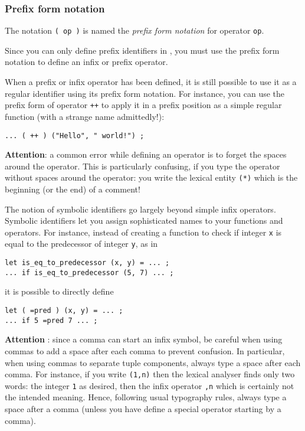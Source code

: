 \subsubsection{Prefix form notation}

The notation {\tt ( op )} is named the {\em prefix form notation} for
operator {\tt op}.

Since you can only define prefix identifiers in {\focal}, you must use the
prefix form notation to define an infix or prefix operator.

When a prefix or infix operator has been defined, it is still possible
to use it as a regular identifier using its prefix form notation.
For instance, you can use the prefix form of operator {\tt ++}
to apply it in a prefix position as a simple regular function (with a
strange name admittedly!):

{\scriptsize
\begin{lstlisting}
... ( ++ ) ("Hello", " world!") ;
\end{lstlisting}
}

{\bf Attention}: a common error while defining an operator is to forget
the spaces around the operator. This is particularly confusing, if you
type the {\tt *} operator without spaces around the operator: you
write the lexical entity {\tt (*)} which is the beginning (or the end)
of a comment!

The {\focal} notion of symbolic identifiers go largely beyond simple
infix operators. Symbolic identifiers let you assign sophisticated names
to your functions and operators.
For instance, instead of creating a function to check if integer {\tt x}
is equal to the predecessor of integer {\tt y}, as in
{\scriptsize
\begin{lstlisting}
let is_eq_to_predecessor (x, y) = ... ;
... if is_eq_to_predecessor (5, 7) ... ;
\end{lstlisting}
}
it is possible to directly define
{\scriptsize
\begin{lstlisting}
let ( =pred ) (x, y) = ... ;
... if 5 =pred 7 ... ;
\end{lstlisting}
}

{\bf Attention} : since a comma can start an infix symbol, be careful
when using commas to add a space after each comma to prevent confusion.
In particular, when using commas to separate tuple components, always type
a space after each comma. For instance, if you write {\tt (1,n)}
then the lexical analyser finds only two words: the integer {\tt 1} as
desired, then the infix operator {\tt ,n} which is certainly not the
intended meaning. Hence, following usual typography rules, always type a
space after a comma (unless you have define a special operator starting
by a comma).

